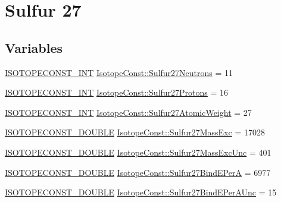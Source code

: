 \hypertarget{group___isotope_const-_sulfur-_s27}{}\section{Sulfur 27}
\label{group___isotope_const-_sulfur-_s27}
\subsection*{Variables}
\begin{DoxyCompactItemize}
\item 
\mbox{\hyperlink{group___isotope_const-_macros_ga5f18360b3e99483a35c32d789e62621c}{I\+S\+O\+T\+O\+P\+E\+C\+O\+N\+S\+T\+\_\+\+I\+NT}} \mbox{\hyperlink{group___isotope_const-_sulfur-_s27_ga24fa6e7fe4263024110b547db50b06a0}{Isotope\+Const\+::\+Sulfur27\+Neutrons}} = 11
\item 
\mbox{\hyperlink{group___isotope_const-_macros_ga5f18360b3e99483a35c32d789e62621c}{I\+S\+O\+T\+O\+P\+E\+C\+O\+N\+S\+T\+\_\+\+I\+NT}} \mbox{\hyperlink{group___isotope_const-_sulfur-_s27_ga0a93ff1c5d99f6dde8f8ac2922797aa4}{Isotope\+Const\+::\+Sulfur27\+Protons}} = 16
\item 
\mbox{\hyperlink{group___isotope_const-_macros_ga5f18360b3e99483a35c32d789e62621c}{I\+S\+O\+T\+O\+P\+E\+C\+O\+N\+S\+T\+\_\+\+I\+NT}} \mbox{\hyperlink{group___isotope_const-_sulfur-_s27_ga0b0acc6d35771ceeb55f474e2c97a890}{Isotope\+Const\+::\+Sulfur27\+Atomic\+Weight}} = 27
\item 
\mbox{\hyperlink{group___isotope_const-_macros_ga8f45a7272ce02c0b4c65c44636ed719a}{I\+S\+O\+T\+O\+P\+E\+C\+O\+N\+S\+T\+\_\+\+D\+O\+U\+B\+LE}} \mbox{\hyperlink{group___isotope_const-_sulfur-_s27_gacfd9a36b3835962eea568c7780d23ff5}{Isotope\+Const\+::\+Sulfur27\+Mass\+Exc}} = 17028
\item 
\mbox{\hyperlink{group___isotope_const-_macros_ga8f45a7272ce02c0b4c65c44636ed719a}{I\+S\+O\+T\+O\+P\+E\+C\+O\+N\+S\+T\+\_\+\+D\+O\+U\+B\+LE}} \mbox{\hyperlink{group___isotope_const-_sulfur-_s27_ga1f22a8e682a3324f15ef79d17f654970}{Isotope\+Const\+::\+Sulfur27\+Mass\+Exc\+Unc}} = 401
\item 
\mbox{\hyperlink{group___isotope_const-_macros_ga8f45a7272ce02c0b4c65c44636ed719a}{I\+S\+O\+T\+O\+P\+E\+C\+O\+N\+S\+T\+\_\+\+D\+O\+U\+B\+LE}} \mbox{\hyperlink{group___isotope_const-_sulfur-_s27_ga317913cd2a74629939d7fd96d4c0bb93}{Isotope\+Const\+::\+Sulfur27\+Bind\+E\+PerA}} = 6977
\item 
\mbox{\hyperlink{group___isotope_const-_macros_ga8f45a7272ce02c0b4c65c44636ed719a}{I\+S\+O\+T\+O\+P\+E\+C\+O\+N\+S\+T\+\_\+\+D\+O\+U\+B\+LE}} \mbox{\hyperlink{group___isotope_const-_sulfur-_s27_ga333640c6b5ca1fc95d34a7f651795685}{Isotope\+Const\+::\+Sulfur27\+Bind\+E\+Per\+A\+Unc}} = 15

\end{DoxyCompactItemize}
